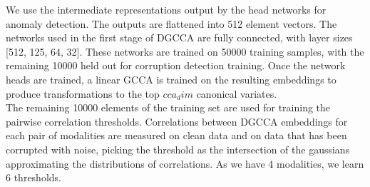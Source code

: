 We use the intermediate representations output by the head networks for anomaly detection. The outputs are flattened into 512 element vectors. The networks used in the first stage of DGCCA are fully connected, with layer sizes [512, 125, 64, 32]. These networks are trained on 50000 training samples, with the remaining 10000 held out for corruption detection training. Once the network heads are trained, a linear GCCA is trained on the resulting embeddings to produce transformations to the top $cca_dim$ canonical variates. \\

The remaining 10000 elements of the training set are used for training the pairwise correlation thresholds. Correlations between DGCCA embeddings for each pair of modalities are measured on clean data and on data that has been corrupted with noise, picking the threshold as the intersection of the gaussians approximating the distributions of correlations. As we have 4 modalities, we learn 6 thresholds.